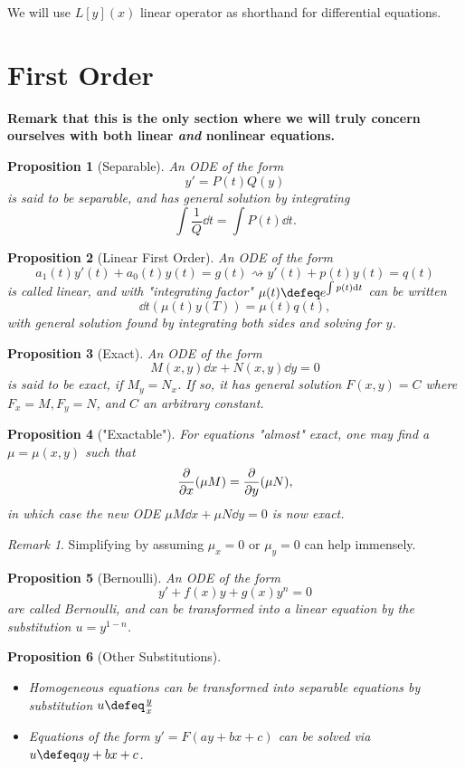 \documentclass[12pt, oneside]{article}
\theoremstyle{definition}
\theoremstyle{plain}
\newtheorem{prop}{Proposition}
\theoremstyle{remark}
\newtheorem{remark}{Remark}
\let\origsection=\section
\renewcommand\section[1]{\origsection{#1}\label{sec:\thesection}}
\begin{document}
We will use $L[y](x)$ linear operator as shorthand for differential equations.

\section{First Order}

\textbf{Remark that this is the only section where we will truly concern ourselves with both linear \emph{and} nonlinear equations.}
\begin{prop}[Separable]
An ODE of the form \[
y' = P(t)Q(y)  
\]  
is said to be separable, and has general solution by integrating \[
 \int \frac{1}{Q} \dd{t} = \int P(t) \dd{t}.  
\]
\end{prop}

\begin{prop}[Linear First Order]
  An ODE of the form \[
  a_1(t)y'(t) + a_0(t)y(t) = g(t) \rightsquigarrow y'(t) + p(t)y(t) = q(t)  
  \]
  is called linear, and with "integrating factor" $\mu(t) \defeq e^{\int p(t) \dd{t}}$ can be written \[
  \dd{t}(\mu(t) y(T)) = \mu(t) q(t),
  \]
  with general solution found by integrating both sides and solving for $y$.
\end{prop}

\begin{prop}[Exact]
  An ODE of the form \[
  M(x, y) \dd{x} + N(x, y) \dd{y} = 0  
  \]
  is said to be exact, if $M_y= N_x$. If so, it has general solution $F(x,y) = C$ where $F_x = M, F_y= N$, and $C$ an arbitrary constant.
\end{prop}

\begin{prop}["Exactable"]
For equations "almost" exact, one may find a $\mu = \mu(x, y)$ such that \[
\pdv{x} (\mu M) = \pdv{y}(\mu N),
\]
in which case the new ODE $\mu M \dd{x} + \mu N \dd{y} = 0$ is now exact. 
\end{prop}
\begin{remark}
  Simplifying by assuming $\mu_x = 0$ or $\mu_y = 0$ can help immensely.
\end{remark}

\begin{prop}[Bernoulli]
  An ODE of the form \[
  y' + f(x)y + g(x)y^n = 0  
  \]
  are called Bernoulli, and can be transformed into a linear equation by the substitution $u = y^{1 - n}$.
\end{prop}

\begin{prop}[Other Substitutions]
  \begin{itemize}
    \item Homogeneous equations can be transformed into separable equations by substitution $u \defeq \frac{y}{x}$
    \item Equations of the form $y' = F(ay + bx + c)$ can be solved via $u \defeq ay + bx + c$.
  \end{itemize}
\end{prop}
\end{document}
